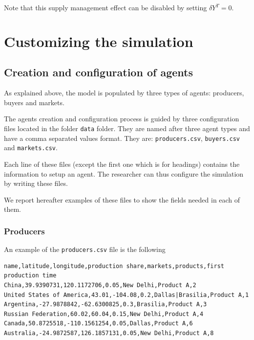 \documentclass{article}
\begin{document}
Note that this supply management effect can be disabled by setting $\delta Y^T=0$.

\section{Customizing the simulation}\label{sec:initialization}
\subsection{Creation and configuration of agents}

As explained above, the model is populated by three types of agents: producers, buyers and markets.

The agents creation and configuration process is guided by three configuration files located in the folder \verb+data+ folder.
They are named after three agent types and have a comma separated values format. They are: \verb+producers.csv+, \verb+buyers.csv+ and \verb+markets.csv+.

Each line of these files (except the first one which is for headings) contains the information to setup an agent. The researcher can thus configure the simulation by writing these files.

We report hereafter examples of these files to show the fields needed in each of them.

\subsubsection{Producers}
An example of the \verb+producers.csv+ file is the following 

\begin{verbatim}
name,latitude,longitude,production share,markets,products,first production time
China,39.9390731,120.1172706,0.05,New Delhi,Product A,2
United States of America,43.01,-104.08,0.2,Dallas|Brasilia,Product A,1
Argentina,-27.9878842,-62.6300825,0.3,Brasilia,Product A,3
Russian Federation,60.02,60.04,0.15,New Delhi,Product A,4
Canada,50.8725518,-110.1561254,0.05,Dallas,Product A,6
Australia,-24.9872587,126.1857131,0.05,New Delhi,Product A,8

\end{verbatim}
\end{document}
